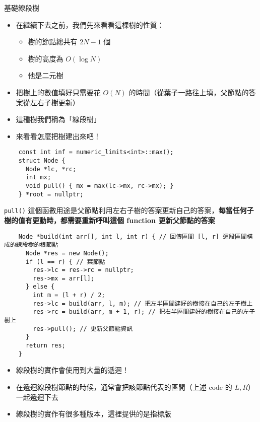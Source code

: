 \documentclass[standalone]{beamer}
\begin{document}
\begin{frame}{基礎線段樹}
  \begin{itemize}
    \item 在繼續下去之前，我們先來看看這棵樹的性質：
      \begin{itemize}
        \item 樹的節點總共有 $2N - 1$ 個
        \item 樹的高度為 $O(\log N)$
        \item 他是二元樹
      \end{itemize}
    \item 把樹上的數值填好只需要花 $O(N)$ 的時間（從葉子一路往上填，父節點的答案從左右子樹更新）
    \item 這種樹我們稱為「線段樹」
    \item 來看看怎麼把樹建出來吧！
  \end{itemize}
\end{frame}

\begin{frame}[fragile]{}
  \begin{verbatim}
    const int inf = numeric_limits<int>::max();
    struct Node {
      Node *lc, *rc;
      int mx;
      void pull() { mx = max(lc->mx, rc->mx); }
    } *root = nullptr;
  \end{verbatim}

  \texttt{pull()} 這個函數用途是父節點利用左右子樹的答案更新自己的答案，\textbf{每當任何子樹的值有更動時，都需要重新呼叫這個 function 更新父節點的答案}
\end{frame}

\begin{frame}[fragile]{}
  \begin{verbatim}
    Node *build(int arr[], int l, int r) { // 回傳區間 [l, r] 這段區間構成的線段樹的根節點
      Node *res = new Node();
      if (l == r) { // 葉節點
        res->lc = res->rc = nullptr;
        res->mx = arr[l];
      } else {
        int m = (l + r) / 2;
        res->lc = build(arr, l, m); // 把左半區間建好的樹接在自己的左子樹上
        res->rc = build(arr, m + 1, r); // 把右半區間建好的樹接在自己的左子樹上
        res->pull(); // 更新父節點資訊
      }
      return res;
    }
  \end{verbatim}
\end{frame}

\begin{frame}[fragile]{}
  \begin{itemize}
    \item 線段樹的實作會使用到大量的遞迴！
    \item 在遞迴線段樹節點的時候，通常會把該節點代表的區間（上述 code 的 $L, R$）一起遞迴下去
    \item 線段樹的實作有很多種版本，這裡提供的是指標版
  \end{itemize}
\end{frame}
\end{document}
